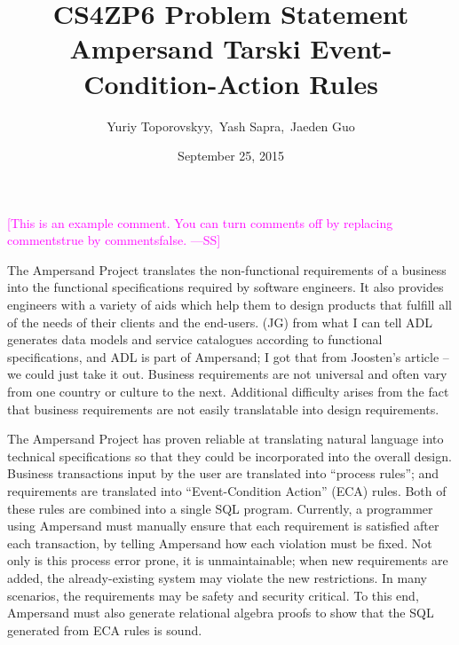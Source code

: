 \documentclass[12pt]{article}
\newcommand{\authornote}[3]{\textcolor{#1}{[#3 ---#2]}}
\newcommand{\authornote}[3]{}
\newcommand{\wss}[1]{\authornote{magenta}{SS}{#1}}
\begin{document}
\title{CS4ZP6 Problem Statement \\ Ampersand Tarski Event-Condition-Action Rules } 
\author{Yuriy Toporovskyy,\ Yash Sapra,\ Jaeden Guo}
\date{September 25, 2015}
\thispagestyle{empty}
\maketitle
\wss{This is an example comment.  You can turn comments off by replacing
		commentstrue by commentsfalse.}


The Ampersand Project translates the non-functional requirements of a
business into the functional specifications required by software engineers. It
also provides engineers with a variety of aids which help them to design
products that fulfill all of the needs of their clients and the end-users.
\edcomm(JG){ from what I can tell ADL generates data models and service 
catalogues according to functional specifications, and ADL is part of 
Ampersand; I got that from Joosten's article -- we could just take it out.}
Business requirements are not universal and often vary from one country or
culture to the next. Additional difficulty arises from the fact that business
requirements are not easily translatable into design requirements.

The Ampersand Project has proven reliable at translating natural
language into technical specifications so that they could be incorporated into
the overall design. Business transactions input by the user are translated into
``process rules''; and requirements are translated into ``Event-Condition
Action'' (ECA) rules. Both of these rules are combined into a single SQL
program. Currently, a programmer using Ampersand must manually ensure that each
requirement is satisfied after each transaction, by telling Ampersand how each
violation must be fixed. Not only is this process error prone, it is
unmaintainable; when new requirements are added, the already-existing system may
violate the new restrictions. In many scenarios, the requirements may be safety
and security critical. To this end, Ampersand must also generate relational
algebra proofs to show that the SQL generated from ECA rules is sound. 
\end{document}

